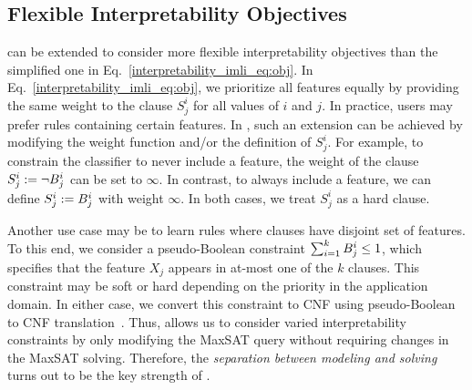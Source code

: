 	
\subsection{Flexible Interpretability Objectives}
\label{interpretability_imli_sec:complex_interpretability_objectives}
{\imli} can be extended to consider more flexible interpretability objectives than the simplified one in Eq.~\eqref{interpretability_imli_eq:obj}. In Eq.~\eqref{interpretability_imli_eq:obj}, we prioritize all features equally by providing the same weight to the clause $ S_j^i $ for all  values of $ i $ and $ j $. In practice, users may prefer rules containing certain features. In {\imli}, such an extension can be achieved by modifying the weight function and/or the definition of  $ S_j^i $. For example, to constrain the classifier to never include a feature, the weight of the clause $ S_j^i := \neg B_j^i $ can be set to $ \infty $. In contrast, to always include a feature, we can define $ S_j^i := B_j^i $ with weight $ \infty $. In both cases, we treat $ S_j^i $ as a hard clause. 

Another use case may be to learn rules where clauses have disjoint set of features. To this end, we consider a pseudo-Boolean constraint $ \sum_{i=1}^k B^i_j \le 1 $, which specifies that the feature $ X_j $ appears in at-most one of the $ k $ clauses. This constraint may be soft or hard depending on the priority in the application domain. In either case, we convert this constraint to CNF using pseudo-Boolean to CNF translation~\cite{philipp2015pblib}. Thus, {\imli} allows us to consider varied interpretability constraints by only modifying the MaxSAT query without requiring changes in the MaxSAT solving. Therefore, the \emph{separation between modeling and solving} turns out to be the key strength of {\imli}.



